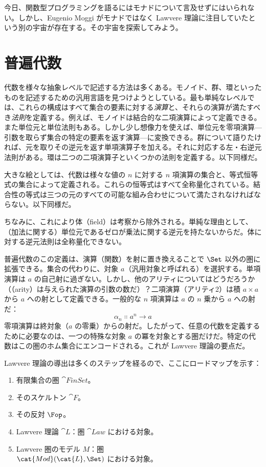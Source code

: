 
\lettrine[lhang=0.17]{今}{日、関数型プログラミングを語るには}モナドについて言及せずにはいられない。しかし、Eugenio Moggi がモナドではなく Lawvere 理論に注目していたという別の宇宙が存在する。その宇宙を探索してみよう。

\section{普遍代数}

代数を様々な抽象レベルで記述する方法は多くある。モノイド、群、環といったものを記述するための汎用言語を見つけようとしている。最も単純なレベルでは、これらの構成はすべて集合の要素に対する\emph{演算}と、それらの演算が満たすべき\emph{法則}を定義する。例えば、モノイドは結合的な二項演算によって定義できる。また単位元と単位法則もある。しかし少し想像力を使えば、単位元を零項演算—引数を取らず集合の特定の要素を返す演算—に変換できる。群について語りたければ、元を取りその逆元を返す単項演算子を加える。それに対応する左・右逆元法則がある。環は二つの二項演算子といくつかの法則を定義する。以下同様だ。

大きな絵としては、代数は様々な値の $n$ に対する $n$ 項演算の集合と、等式恒等式の集合によって定義される。これらの恒等式はすべて全称量化されている。結合性の等式は三つの元のすべての可能な組み合わせについて満たされなければならない。以下同様だ。

ちなみに、これにより体（field）は考察から除外される。単純な理由として、（加法に関する）単位元であるゼロが乗法に関する逆元を持たないからだ。体に対する逆元法則は全称量化できない。

普遍代数のこの定義は、演算（関数）を射に置き換えることで $\Set$ 以外の圏に拡張できる。集合の代わりに、対象 $a$（汎用対象と呼ばれる）を選択する。単項演算は $a$ の自己射に過ぎない。しかし、他のアリティについてはどうだろうか（（arity）は与えられた演算の引数の数だ）？二項演算（アリティ2）は積 $a\times{}a$ から $a$ への射として定義できる。一般的な $n$ 項演算は $a$ の $n$ 乗から $a$ への射だ：
\[\alpha_n \Colon a^n \to a\]
零項演算は終対象（$a$ の零乗）からの射だ。したがって、任意の代数を定義するために必要なのは、一つの特殊な対象 $a$ の冪を対象とする圏だけだ。特定の代数はこの圏のホム集合にエンコードされる。これが Lawvere 理論の要点だ。

Lawvere 理論の導出は多くのステップを経るので、ここにロードマップを示す：

\begin{enumerate}
  \tightlist
  \item
        有限集合の圏 $\cat{FinSet}$。
  \item
        そのスケルトン $\cat{F}$。
  \item
        その反対 $\Fop$。
  \item
        Lawvere 理論 $\cat{L}$：圏 $\cat{Law}$ における対象。
  \item
        Lawvere 圏のモデル $M$：圏\\
        $\cat{Mod}(\cat{L}, \Set)$ における対象。
\end{enumerate}

